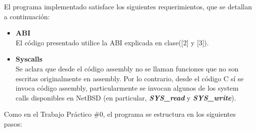 \documentclass[11pt,a4paper]{article}
\begin{document}
El programa implementado satisface los siguientes requerimientos, que se detallan a continuación:
\begin{itemize}
	\item{\textbf{ABI}}\\
	 El código presentado utilice la ABI explicada en clase([2] y [3]).
	\item{\textbf{Syscalls}}\\
	Se aclara que desde el código assembly no se llaman funciones que no son escritas originalmente en assembly. Por lo contrario, desde el código C sí se invoca código assembly, particularmente se invocan algunos de los system calls disponibles en NetBSD (en particular, \textit{\textbf{SYS\_read}} y \textit{\textbf{SYS\_write}}).
\end{itemize}

Como en el Trabajo Práctico \#0, el programa se estructura en los siguientes pasos:
\end{document}
